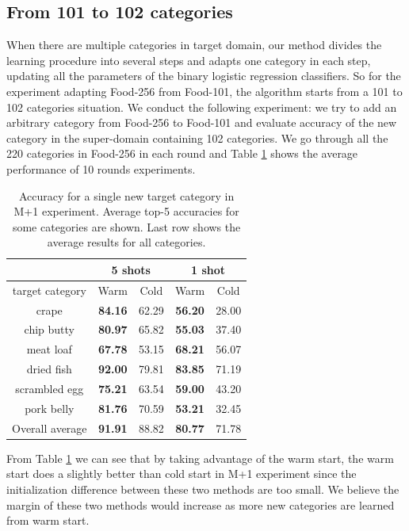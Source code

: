 \subsection{From 101 to 102 categories}
When there are multiple categories in target domain, our method divides the learning procedure into several steps and adapts one category in each step, updating all the parameters of the binary logistic regression classifiers. So for the experiment adapting Food-256 from Food-101, the algorithm starts from a 101 to 102 categories situation. We conduct the following experiment: we try to add an arbitrary category from Food-256 to Food-101 and evaluate accuracy of the new category in the super-domain containing 102 categories. We go through all the 220 categories in Food-256 in each round and Table \ref{tab:N+1} shows the average performance of 10 rounds experiments.

\begin{table}[htbp]
  \centering
  \caption{Accuracy for a single new target category in M+1 experiment. Average top-5 accuracies for some categories are shown. Last row shows the average results for all categories.}
    \begin{tabular}{c|cc|cc}
    \toprule
          & \multicolumn{2}{c|}{5 shots} & \multicolumn{2}{c}{1 shot} \\
    \midrule
       target category   & \multicolumn{1}{c}{Warm} & \multicolumn{1}{c|}{Cold} & \multicolumn{1}{c}{Warm} & \multicolumn{1}{c}{Cold} \\
        \midrule
    crape & \textbf{84.16} & 62.29 & \textbf{56.20}  & 28.00 \\
   chip butty & \textbf{80.97} & 65.82 & \textbf{55.03} & 37.40 \\
    meat loaf & \textbf{67.78} & 53.15 & \textbf{68.21} & 56.07 \\
    dried fish & \textbf{92.00}    & 79.81 &\textbf{83.85} & 71.19 \\
   scrambled egg & \textbf{75.21} & 63.54 & \textbf{59.00}    & 43.20 \\
    pork belly & \textbf{81.76 }& 70.59 &\textbf{53.21} & 32.45 \\
    \midrule
    Overall average &\textbf{91.91}&88.82  & \textbf{80.77} & 71.78 \\
    \bottomrule
    \end{tabular}%
  \label{tab:N+1}%
\end{table}%
From Table \ref{tab:N+1} we can see that by taking advantage of the warm start, the warm start does a slightly better than cold start in M+1 experiment since the initialization difference between these two methods are too small. We believe the margin of these two methods would increase as more new categories are learned from warm start.

